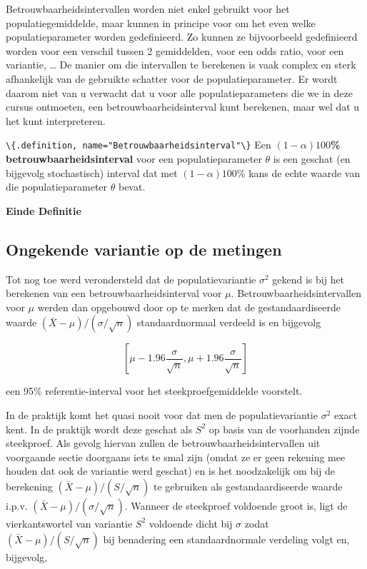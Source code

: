 \documentclass[
  12pt,dutch,coursenotes]{book}
\newcommand{\passthrough}[1]{#1}
\begin{document}
Betrouwbaarheidsintervallen worden niet enkel gebruikt voor het
populatiegemiddelde, maar kunnen in principe voor om het even welke
populatieparameter worden gedefinieerd. Zo kunnen ze bijvoorbeeld
gedefinieerd worden voor een verschil tussen 2 gemiddelden, voor een odds ratio, voor een variantie, \ldots{} De manier om die
intervallen te berekenen is vaak complex en sterk afhankelijk van de
gebruikte schatter voor de populatieparameter. Er wordt daarom niet van u
verwacht dat u voor alle populatieparameters die we in deze cursus
ontmoeten, een betrouwbaarheidsinterval kunt berekenen, maar wel dat u het
kunt interpreteren.

\passthrough{\lstinline!\{.definition, name="Betrouwbaarheidsinterval"\}!}
Een \textbf{\((1-\alpha)100\)\% betrouwbaarheidsinterval} voor een populatieparameter \(\theta\) is een
geschat (en bijgevolg stochastisch) interval dat met \((1-\alpha)100\)\% kans
de echte waarde van die populatieparameter \(\theta\) bevat.

\textbf{Einde Definitie}

\hypertarget{sec:tBI}{%
\subsection{Ongekende variantie op de metingen}\label{sec:tBI}}

Tot nog toe werd verondersteld dat de populatievariantie \(\sigma^2\) gekend is bij het berekenen van een betrouwbaarheidsinterval voor \(\mu\).
Betrouwbaarheidsintervallen voor \(\mu\) werden dan opgebouwd door op te
merken dat de gestandaardiseerde waarde \((\bar{X} - \mu)/(\sigma/\sqrt{n})\)
standaardnormaal verdeeld is en bijgevolg

\begin{equation*}
\left[\mu - 1.96 \frac{\sigma}{\sqrt{n}},\mu + 1.96 \frac{\sigma}{\sqrt{n}}%
\right]
\end{equation*}

een 95\% referentie-interval voor het steekproefgemiddelde voorstelt.

In de praktijk komt het quasi nooit voor dat men de populatievariantie \(\sigma^2\) exact kent. In de praktijk wordt deze geschat als \(S^2\) op basis van de voorhanden zijnde steekproef. Als gevolg hiervan zullen de betrouwbaarheidsintervallen uit voorgaande sectie doorgaans iets te smal zijn (omdat ze er geen rekening mee houden dat ook de variantie werd geschat) en is het
noodzakelijk om bij de berekening \((\bar{X} - \mu)/(S/\sqrt{n})\) te
gebruiken als gestandaardiseerde waarde i.p.v. \((\bar{X} - \mu)/(\sigma/\sqrt{n})\). Wanneer de steekproef voldoende groot is, ligt de vierkantswortel van variantie \(S^2\) voldoende dicht bij \(\sigma\) zodat \({(\bar{X} - \mu)}/{(S/\sqrt{n}) }\) bij benadering een standaardnormale verdeling volgt en, bijgevolg,
\end{document}
